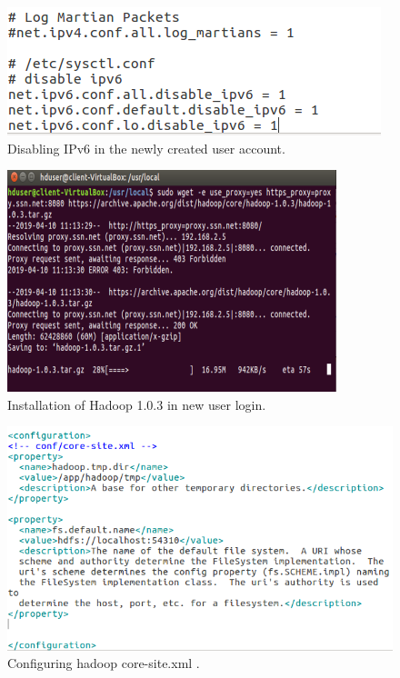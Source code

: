 \documentclass[a4paper,10pt]{article}
\begin{document}
\begin{figure}[h]
	\includegraphics[scale=0.34,center]{exptFourScreenShot/fig5Two.png}
	\caption{Disabling IPv6 in the newly created user account.}
	\label{fig:5.2}
\end{figure}

\begin{figure}[h]
	\includegraphics[scale=0.45,center]{exptFourScreenShot/fig6.png}
	\caption{Installation of Hadoop 1.0.3 in new user login.}
	\label{fig:6}
\end{figure}
\newpage
\begin{figure}[h]
	\includegraphics[scale=0.30,center]{exptFourScreenShot/fig7.png}
	\caption{Configuring hadoop core-site.xml .}
	\label{fig:7}
\end{figure}
\end{document}
